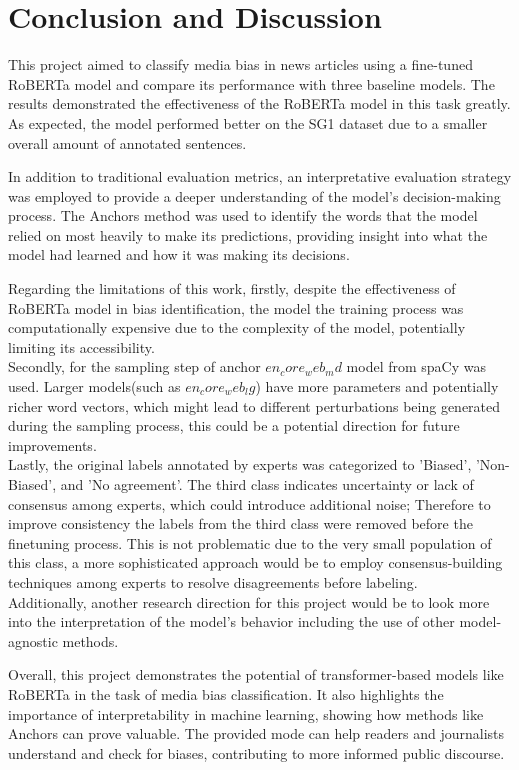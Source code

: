 \documentclass[11pt,a4paper]{article}
\begin{document}
\section{Conclusion and Discussion}
This project aimed to classify media bias in news articles using a fine-tuned RoBERTa model and compare its performance with three baseline models. The results demonstrated the effectiveness of the RoBERTa model in this task greatly. As expected, the model performed better on the SG1 dataset due to a smaller overall amount of annotated sentences.

In addition to traditional evaluation metrics, an interpretative evaluation strategy was employed to provide a deeper understanding of the model’s decision-making process. The Anchors method was used to identify the words that the model relied on most heavily to make its predictions, providing insight into what the model had learned and how it was making its decisions.

Regarding the limitations of this work, firstly, despite the effectiveness of RoBERTa model in bias identification, the model the training process was computationally expensive due to the complexity of the model, potentially limiting its accessibility.\\
Secondly, for the sampling step of anchor $en_core_web_md$ model from spaCy was used. Larger models(such as $en_core_web_lg$) have more parameters and potentially richer word vectors, which might lead to different perturbations being generated during the sampling process, this could be a potential direction for future improvements.\\
Lastly, the original labels annotated by experts was categorized to 'Biased', 'Non-Biased', and 'No agreement'. The third class indicates uncertainty or lack of consensus among experts, which could introduce additional noise; Therefore to improve consistency the labels from the third class were removed before the finetuning process. This is not problematic due to the very small population of this class, a more sophisticated approach would be to employ consensus-building techniques among experts to resolve disagreements before labeling.\\
Additionally, another research direction for this project would be to look more into the interpretation of the model's behavior including the use of other model-agnostic methods.

Overall, this project demonstrates the potential of transformer-based models like RoBERTa in the task of media bias classification. It also highlights the importance of interpretability in machine learning, showing how methods like Anchors can prove valuable. The provided mode can help readers and journalists understand and check for biases, contributing to more informed public discourse.
\newpage


\end{document}
